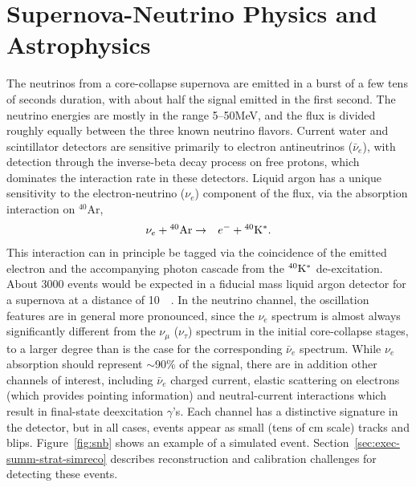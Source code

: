 

\section{Supernova-Neutrino Physics and Astrophysics}

The neutrinos from a core-collapse supernova are emitted in a burst of
a few tens of seconds duration, with about half the signal emitted in the first
second. The neutrino energies are mostly in the range \numrange{5}{50}{MeV}, and the 
flux is divided roughly equally between the three known neutrino
flavors.  Current water and scintillator detectors are sensitive primarily to
electron antineutrinos ($\bar{\nu}_e$), with detection through the inverse-beta decay
process on free protons, 
 which dominates the interaction rate in these detectors.  Liquid argon has a unique sensitivity to
the electron-neutrino ($\nu_e$) component of the flux, via the absorption
interaction on $^{40}$Ar,
\begin{eqnarray*}
\nu_e +{}^{40}{\rm Ar} & \rightarrow & e^-+{}^{40}{\rm K^*}.
\end{eqnarray*} 
This interaction can in principle be tagged via the coincidence of the emitted
electron and the accompanying photon cascade from the $^{40}{\rm K^*}$
de-excitation.  About \num{3000} events would be expected in a 
fiducial mass liquid argon detector for a supernova at a distance of
\SI{10}{\kilo\parsec}.  In the neutrino channel, the oscillation
features are in general more pronounced, since the $\nu_e$ spectrum is almost
always significantly different from the $\nu_\mu$ ($\nu_\tau$) spectrum 
in the initial core-collapse stages, to a larger degree than is the
case for the corresponding $\bar{\nu}_e$ spectrum.  
While $\nu_e$ absorption should represent $\sim$90\% of the signal, there are in addition other channels of interest, including $\bar{\nu}_e$ charged current, elastic scattering on electrons (which provides pointing information) and neutral-current
interactions which result in final-state deexcitation $\gamma$'s. 
Each channel has a distinctive signature in the detector, but in all cases, events appear as small (tens of cm scale) tracks and blips.   Figure~\ref{fig:snb} shows an example of a simulated event.  Section~\ref{sec:exec-summ-strat-simreco} describes reconstruction and calibration challenges for detecting these events.


